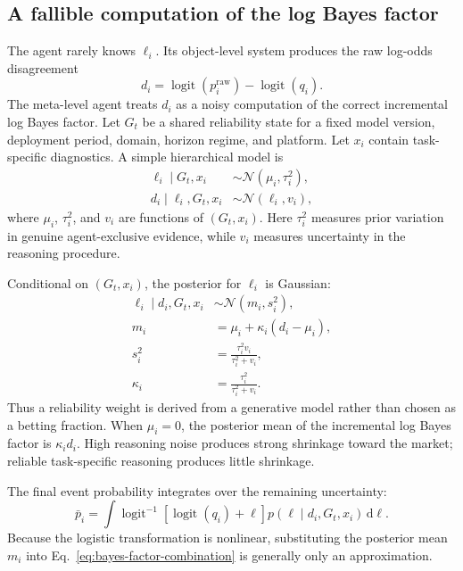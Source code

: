 \documentclass[journal,a4paper]{IEEEtran}
\newcommand{\sigmoid}{\operatorname{logit}^{-1}}
\newcommand{\logit}{\operatorname{logit}}
\newcommand{\Normal}{\mathcal{N}}
\begin{document}
\subsection{A fallible computation of the log Bayes factor}
The agent rarely knows $\ell_i$. Its object-level system produces the raw log-odds disagreement
\begin{equation}
d_i
=
\logit(p_i^{\mathrm{raw}})-\logit(q_i).
\label{eq:raw-disagreement}
\end{equation}
The meta-level agent treats $d_i$ as a noisy computation of the correct incremental log Bayes factor. Let $G_t$ be a shared reliability state for a fixed model version, deployment period, domain, horizon regime, and platform. Let $x_i$ contain task-specific diagnostics. A simple hierarchical model is
\begin{align}
\ell_i\mid G_t,x_i
&\sim
\Normal\!\left(\mu_i,\tau_i^2\right),
\label{eq:latent-evidence-prior}\\
d_i\mid \ell_i,G_t,x_i
&\sim
\Normal\!\left(\ell_i,v_i\right),
\label{eq:reasoning-observation}
\end{align}
where $\mu_i$, $\tau_i^2$, and $v_i$ are functions of $(G_t,x_i)$. Here $\tau_i^2$ measures prior variation in genuine agent-exclusive evidence, while $v_i$ measures uncertainty in the reasoning procedure.

Conditional on $(G_t,x_i)$, the posterior for $\ell_i$ is Gaussian:
\begin{align}
\ell_i\mid d_i,G_t,x_i
&\sim \Normal(m_i,s_i^2),\\
m_i
&=
\mu_i+\kappa_i(d_i-\mu_i),
\label{eq:posterior-log-bf-mean}\\
s_i^2
&=
\frac{\tau_i^2v_i}{\tau_i^2+v_i},\\
\kappa_i
&=
\frac{\tau_i^2}{\tau_i^2+v_i}.
\label{eq:bayesian-reliability}
\end{align}
Thus a reliability weight is derived from a generative model rather than chosen as a betting fraction. When $\mu_i=0$, the posterior mean of the incremental log Bayes factor is $\kappa_i d_i$. High reasoning noise produces strong shrinkage toward the market; reliable task-specific reasoning produces little shrinkage.

The final event probability integrates over the remaining uncertainty:
\begin{equation}
\bar p_i
=
\int
\sigmoid\!\left[\logit(q_i)+\ell\right]
 p(\ell\mid d_i,G_t,x_i)\,\mathrm{d}\ell.
\label{eq:meta-predictive-probability}
\end{equation}
Because the logistic transformation is nonlinear, substituting the posterior mean $m_i$ into Eq.~\eqref{eq:bayes-factor-combination} is generally only an approximation.
\end{document}
